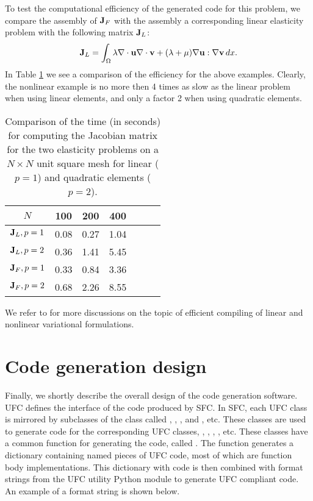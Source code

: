 To test the computational efficiency of the generated code
for this problem, we compare the assembly of $\mathbf{J}_F$ with the assembly a corresponding linear
elasticity problem with the following matrix $\mathbf{J}_L$:
\[
\mathbf{J}_L = \int_\Omega \lambda \nabla \cdot \mathbf{u} \nabla \cdot \mathbf{v} + (\lambda + \mu)\nabla \mathbf{u}:\nabla \mathbf{v} \, dx . 
\]
In Table \ref{SFCtest} we see a comparison of the efficiency for the above examples. 
Clearly, the nonlinear example is no more then 4 times as slow as the linear problem when using linear elements, and only a factor 2 when 
using quadratic elements. 
\begin{table}[h]
\begin{center}
\begin{tabular}{|c|c|c|c|c|c|c|} \hline
$N$              & 100   & 200  & 400    \\ \hline 
$\mathbf{J}_L, p=1$     & 0.08  & 0.27  & 1.04     \\ \hline 
$\mathbf{J}_L, p=2$     & 0.36  & 1.41  & 5.45      \\ \hline 
$\mathbf{J}_F, p=1$     & 0.33  & 0.84  & 3.36     \\ \hline 
$\mathbf{J}_F, p=2$     & 0.68  & 2.26  & 8.55     \\ \hline 
\end{tabular}
\caption{Comparison of the time (in seconds) for computing the Jacobian matrix for 
the two elasticity problems on a $N\times N$ unit square mesh for linear ($p=1$) and quadratic elements ($p=2$).} 
\label{SFCtest}
\end{center}
\end{table}

We refer to \cite{AlnaesMardal2009b,OlgaardLoggEtAl2008,KirbyLogg2008b,oelgaard:2010}   
for more discussions on the topic of efficient compiling of linear and nonlinear variational formulations. 



\section{Code generation design}



Finally, we shortly describe the overall design of the code generation software.
UFC defines the interface of the code produced by SFC. 
In SFC, each UFC class is mirrored by  subclasses of the class  called 
, , , and , etc. 
These classes are used 
to generate code for the corresponding UFC classes, , , , 
, etc. These classes have 
a common function for generating the code, called .  
The function  generates a dictionary containing named
pieces of UFC code, most of which are function body implementations.
This dictionary with code is then combined with format strings from the
UFC utility Python module to generate UFC compliant code.  
An example of a format string is shown below.

